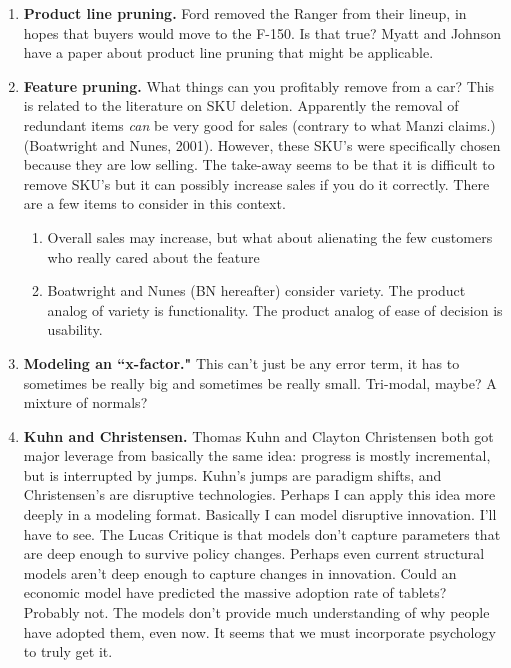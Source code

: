\documentclass[paper=a4, fontsize=11pt]{scrartcl} %
\numberwithin{equation}{section} %
\numberwithin{figure}{section} %
\numberwithin{table}{section} %
\begin{document}
\begin{enumerate}
\item \textbf{Product line pruning.}  Ford removed the Ranger from their lineup, in hopes that buyers would move to the F-150.  Is that true?  Myatt and Johnson have a paper about product line pruning that might be applicable. 

\item \textbf{Feature pruning.}  What things can you profitably remove from a car?  This is related to the literature on SKU deletion.  Apparently the removal of redundant items \textit{can} be very good for sales (contrary to what Manzi claims.) (Boatwright and Nunes, 2001).  However, these SKU's were specifically chosen because they are low selling.  The take-away seems to be that it is difficult to remove SKU's but it can possibly increase sales if you do it correctly.  There are a few items to consider in this context. 
	\begin{enumerate}
	\item Overall sales may increase, but what about alienating the few customers who really cared about the feature
	\item Boatwright and Nunes (BN hereafter) consider variety.  The product analog of variety is functionality.  The product analog of ease of decision is usability.   
	\end{enumerate}

\item \textbf{Modeling an ``x-factor."}  This can't just be any error term, it has to sometimes be really big and sometimes be really small.  Tri-modal, maybe?  A mixture of normals?

\item \textbf{Kuhn and Christensen.}  Thomas Kuhn and Clayton Christensen both got major leverage from basically the same idea: progress is mostly incremental, but is interrupted by jumps.  Kuhn's jumps are paradigm shifts, and Christensen's are disruptive technologies.  Perhaps I can apply this idea more deeply in a modeling format.  Basically I can model disruptive innovation.  I'll have to see.  The Lucas Critique is that models don't capture parameters that are deep enough to survive policy changes.  Perhaps even current structural models aren't deep enough to capture changes in innovation.  Could an economic model have predicted the massive adoption rate of tablets?  Probably not.  The models don't provide much understanding of why people have adopted them, even now.  It seems that we must incorporate psychology to truly get it.  



\end{enumerate}
\end{document}
